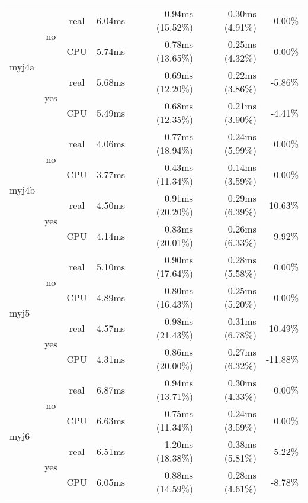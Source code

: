 \documentclass[en]{pracamgr}
\begin{document}
\begin{small}
\begin{longtable}{|l|c|c|r|r|r|r|}
\hline
\multirow{4}{*}{myj4a}    & \multirow{2}{*}{no}  & real & 6.04ms & 0.94ms (15.52\%) & 0.30ms (4.91\%) & 0.00\% \\*
                          &                      & CPU  & 5.74ms & 0.78ms (13.65\%) & 0.25ms (4.32\%) & 0.00\% \\*
                          \cline{2-7}
                          & \multirow{2}{*}{yes} & real & 5.68ms & 0.69ms (12.20\%) & 0.22ms (3.86\%) & -5.86\% \\*
                          &                      & CPU  & 5.49ms & 0.68ms (12.35\%) & 0.21ms (3.90\%) & -4.41\% \\
\hline
\multirow{4}{*}{myj4b}    & \multirow{2}{*}{no}  & real & 4.06ms & 0.77ms (18.94\%) & 0.24ms (5.99\%) & 0.00\% \\*
                          &                      & CPU  & 3.77ms & 0.43ms (11.34\%) & 0.14ms (3.59\%) & 0.00\% \\*
                          \cline{2-7}
                          & \multirow{2}{*}{yes} & real & 4.50ms & 0.91ms (20.20\%) & 0.29ms (6.39\%) & 10.63\% \\*
                          &                      & CPU  & 4.14ms & 0.83ms (20.01\%) & 0.26ms (6.33\%) & 9.92\% \\
\hline
\multirow{4}{*}{myj5}     & \multirow{2}{*}{no}  & real & 5.10ms & 0.90ms (17.64\%) & 0.28ms (5.58\%) & 0.00\% \\*
                          &                      & CPU  & 4.89ms & 0.80ms (16.43\%) & 0.25ms (5.20\%) & 0.00\% \\*
                          \cline{2-7}
                          & \multirow{2}{*}{yes} & real & 4.57ms & 0.98ms (21.43\%) & 0.31ms (6.78\%) & -10.49\% \\*
                          &                      & CPU  & 4.31ms & 0.86ms (20.00\%) & 0.27ms (6.32\%) & -11.88\% \\
\hline
\multirow{4}{*}{myj6}     & \multirow{2}{*}{no}  & real & 6.87ms & 0.94ms (13.71\%) & 0.30ms (4.33\%) & 0.00\% \\*
                          &                      & CPU  & 6.63ms & 0.75ms (11.34\%) & 0.24ms (3.59\%) & 0.00\% \\*
                          \cline{2-7}
                          & \multirow{2}{*}{yes} & real & 6.51ms & 1.20ms (18.38\%) & 0.38ms (5.81\%) & -5.22\% \\*
                          &                      & CPU  & 6.05ms & 0.88ms (14.59\%) & 0.28ms (4.61\%) & -8.78\% \\

\end{longtable}
\end{small}
\end{document}
